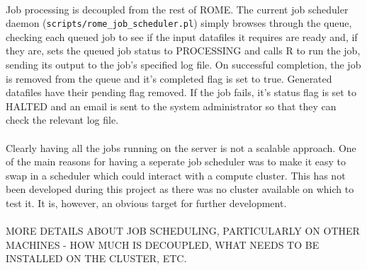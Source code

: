 \paragraph{}
Job processing is decoupled from the rest of ROME. The current job scheduler daemon (\texttt{scripts/rome\_job\_scheduler.pl}) simply browses through the queue, checking each queued job to see if the input datafiles it requires are ready and, if they are, sets the queued job status to PROCESSING and calls R to run the job, sending its output to the job's specified log file. On successful completion, the job is removed from the queue and it's completed flag is set to true. Generated datafiles have their pending flag removed. If the job fails, it's status flag is set to HALTED and an email is sent to the system administrator so that they can check the relevant log file.

\paragraph{}
Clearly having all the jobs running on the server is not a scalable approach. One of the main reasons for having a seperate job scheduler was to make it easy to swap in a scheduler which could interact with a compute cluster. This has not been developed during this project as there was no cluster available on which to test it. It is, however, an obvious target for further development.

\paragraph{}
MORE DETAILS ABOUT JOB SCHEDULING, PARTICULARLY ON OTHER MACHINES - HOW MUCH IS DECOUPLED, WHAT NEEDS TO BE INSTALLED ON THE CLUSTER, ETC.



